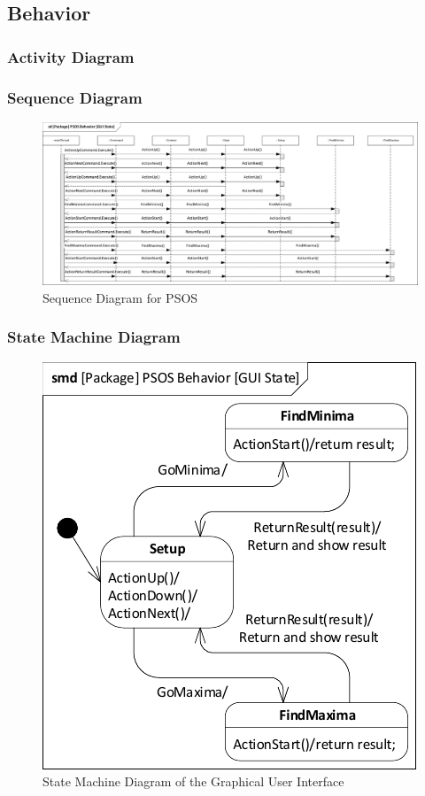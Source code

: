 \subsection{Behavior} \label{requirementspecification:Behavior}

\subsubsection{Activity Diagram}

\subsubsection{Sequence Diagram}
\begin{figure}[H]
	\centering
	\includegraphics[width=1\linewidth]{diagram/sd_psos}
	\caption{Sequence Diagram for PSOS}
	\label{fig:sdpsos}
\end{figure}



\subsubsection{State Machine Diagram}

\begin{figure}[H]
	\centering
	\includegraphics[width=0.7\linewidth]{diagram/smd_gui_state}
	\caption{State Machine Diagram of the Graphical User Interface}
	\label{fig:smdguistate}
\end{figure}
